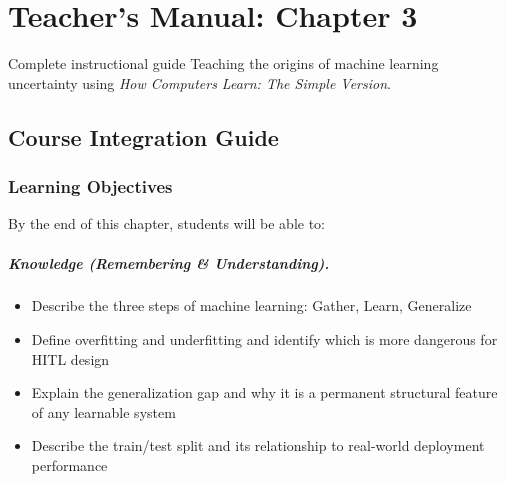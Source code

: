 
\chapter{Teacher's Manual: Chapter 3}
\label{ch:teacher-ch03}

\begin{chapterquote}{Complete instructional guide}
Teaching the origins of machine learning uncertainty using \emph{How Computers Learn: The Simple Version}.
\end{chapterquote}

\section{Course Integration Guide}

\subsection{Learning Objectives}

By the end of this chapter, students will be able to:

\paragraph{Knowledge (Remembering \& Understanding).}
\begin{itemize}
    \item Describe the three steps of machine learning: Gather, Learn, Generalize
    \item Define overfitting and underfitting and identify which is more dangerous for HITL design
    \item Explain the generalization gap and why it is a permanent structural feature of any learnable system
    \item Describe the train/test split and its relationship to real-world deployment performance
\end{itemize}

